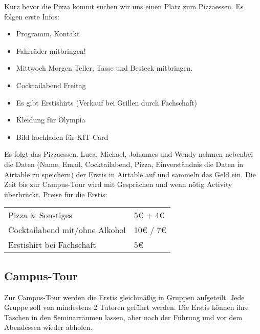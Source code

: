 \documentclass[10pt,twocolumn,ngerman]{scrartcl}
\providecommand{\tabularnewline}{\\}
\begin{document}
Kurz bevor die Pizza kommt suchen wir uns einen Platz zum Pizzaessen.
Es folgen erste Infos:
\begin{itemize}
\item Programm, Kontakt
\item Fahrräder mitbringen!
\item Mittwoch Morgen Teller, Tasse und Besteck mitbringen.
\item Cocktailabend Freitag
\item Es gibt Erstishirts (Verkauf bei Grillen durch Fachschaft)
\item Kleidung für Olympia
\item Bild hochladen für KIT-Card
\end{itemize}
Es folgt das Pizzaessen. Luca, Michael, Johannes und Wendy nehmen
nebenbei die Daten (Name, Email, Cocktailabend, Pizza, Einverständnis
die Daten in Airtable zu speichern) der Erstis in Airtable auf und
sammeln das Geld ein. Die Zeit bis zur Campus-Tour wird mit Gesprächen
und wenn nötig Activity überbrückt. Preise für die Erstis:

\medskip{}

\begin{tabular}{ll}
Pizza \& Sonstiges & 5€ + 4€\tabularnewline
Cocktailabend mit/ohne Alkohol & 10€ / 7€\tabularnewline
Erstishirt bei Fachschaft & 5€\tabularnewline
\end{tabular}

\subsection{Campus-Tour}

Zur Campus-Tour werden die Erstis gleichmäßig in Gruppen aufgeteilt.
Jede Gruppe soll von mindestens 2 Tutoren geführt werden. Die Erstis
können ihre Taschen in den Seminarräumen lassen, aber nach der Führung
und vor dem Abendessen wieder abholen.
\end{document}
